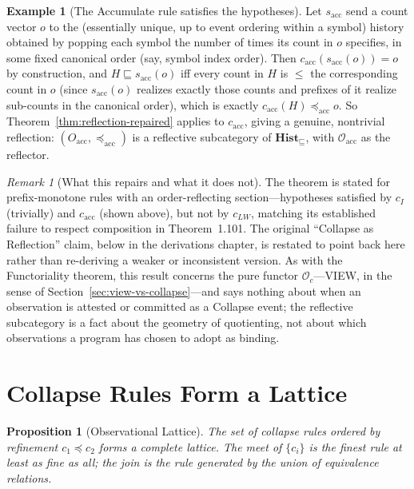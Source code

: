 \documentclass[12pt, a4paper, openany]{book}
\theoremstyle{plain}
\newtheorem{proposition}[theorem]{Proposition}
\theoremstyle{definition}
\newtheorem{example}[theorem]{Example}
\theoremstyle{remark}
\newtheorem{remark}[theorem]{Remark}
\newcommand{\Hist}{\mathbf{Hist}}
\begin{document}
\begin{example}[The Accumulate rule satisfies the hypotheses]
Let $s_{\mathrm{acc}}$ send a count vector $o$ to the (essentially unique, up to
event ordering within a symbol) history obtained by popping each symbol the
number of times its count in $o$ specifies, in some fixed canonical order (say,
symbol index order). Then $c_{\mathrm{acc}}(s_{\mathrm{acc}}(o)) = o$ by
construction, and $H \sqsubseteq s_{\mathrm{acc}}(o)$ iff every count in $H$ is
$\leq$ the corresponding count in $o$ (since $s_{\mathrm{acc}}(o)$ realizes
exactly those counts and prefixes of it realize sub-counts in the canonical
order), which is exactly $c_{\mathrm{acc}}(H) \preceq_{\mathrm{acc}} o$. So
Theorem~\ref{thm:reflection-repaired} applies to $c_{\mathrm{acc}}$, giving a
genuine, nontrivial reflection: $(O_{\mathrm{acc}}, \preceq_{\mathrm{acc}})$ is
a reflective subcategory of $\Hist_\sqsubseteq$, with $\mathcal{O}_{\mathrm{acc}}$
as the reflector.
\end{example}

\begin{remark}[What this repairs and what it does not]
The theorem is stated for prefix-monotone rules with an order-reflecting
section---hypotheses satisfied by $c_I$ (trivially) and $c_{\mathrm{acc}}$
(shown above), but not by $c_{LW}$, matching its established failure to respect
composition in Theorem~1.101. The original ``Collapse as Reflection'' claim,
below in the derivations chapter, is restated to point back here rather than
re-deriving a weaker or inconsistent version. As with the Functoriality
theorem, this result concerns the pure functor $\mathcal{O}_c$---VIEW, in the
sense of Section~\ref{sec:view-vs-collapse}---and says nothing about when an
observation is attested or committed as a Collapse event; the reflective
subcategory is a fact about the geometry of quotienting, not about which
observations a program has chosen to adopt as binding.
\end{remark}

\section{Collapse Rules Form a Lattice}

\begin{proposition}[Observational Lattice]
The set of collapse rules ordered by refinement $c_1 \preceq c_2$ forms a complete
lattice. The meet of $\{c_i\}$ is the finest rule at least as fine as all; the
join is the rule generated by the union of equivalence relations.
\end{proposition}
\end{document}
